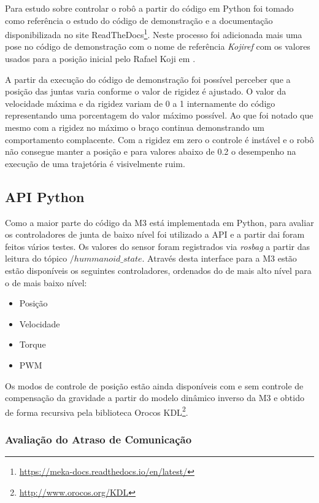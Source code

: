 Para estudo sobre controlar o robô a partir do código em Python foi tomado como referência o estudo do código de demonstração e a documentação disponibilizada no site ReadTheDocs\footnote{\url{https://meka-docs.readthedocs.io/en/latest/}}. Neste processo foi adicionada mais uma pose no código de demonstração com o nome de referência \textit{Kojiref} com os valores usados para a posição inicial pelo Rafael Koji em \cite{koji2017}.

A partir da execução do código de demonstração foi possível perceber que a posição das juntas varia conforme o valor de rigidez é ajustado. O valor da velocidade máxima e da rigidez variam de 0 a 1 internamente do código representando uma porcentagem do valor máximo possível. Ao que foi notado que mesmo com a rigidez no máximo o braço continua demonstrando um comportamento complacente. Com a rigidez em zero o controle é instável e o robô não consegue manter a posição e para valores abaixo de 0.2 o desempenho na execução de uma trajetória é visivelmente ruim.


\subsection{API Python}

Como a maior parte do código da M3 está implementada em Python, para avaliar os controladores de junta de baixo nível foi utilizado a API e a partir dai foram feitos vários testes. Os valores do sensor foram registrados via \textit{rosbag} a partir das leitura do tópico $/hummanoid\_state$. Através desta interface para a M3 estão estão disponíveis os seguintes controladores, ordenados do de mais alto nível para o de mais baixo nível:

\begin{itemize}
    \item Posição
    \item Velocidade
    \item Torque
    \item PWM
\end{itemize}

Os modos de controle de posição estão ainda disponíveis com e sem controle de compensação da gravidade a partir do modelo dinâmico inverso da M3 e obtido de forma recursiva pela biblioteca Orocos KDL\footnote{\url{http://www.orocos.org/KDL}}.

\subsubsection{Avaliação do Atraso de Comunicação}\label{subsec:deadtimepython}

